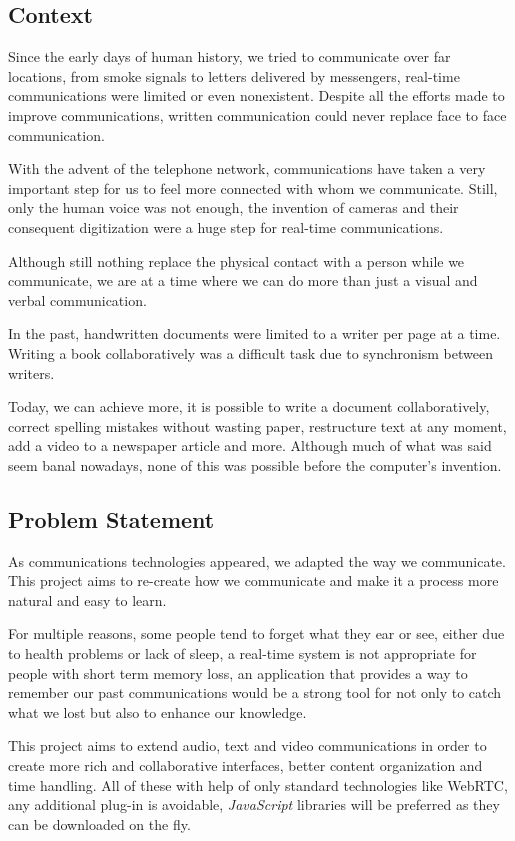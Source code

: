 \subsection{Context}   %
 	Since the early days of human history, we tried to communicate over far locations, from smoke signals to letters delivered by messengers, real-time communications were limited or even nonexistent. Despite all the efforts made to improve communications, written communication could never replace face to face communication.

	With the advent of the telephone network, communications have taken a very important step for us to feel more connected with whom we communicate. Still, only the human voice was not enough, the invention of cameras and their consequent digitization were a huge step for real-time communications.

 	Although still nothing replace the physical contact with a person while we communicate, we are at a time where we can do more than just a visual and verbal communication.
 	
	In the past, handwritten documents were limited to a writer per page at a time. Writing a book collaboratively was a difficult task due to synchronism between writers.

	Today, we can achieve more, it is possible to write a document collaboratively, correct spelling mistakes without wasting paper, restructure text at any moment, add a video to a newspaper article and more. Although much of what was said seem banal nowadays, none of this was possible before the computer's invention. 

\subsection{Problem Statement} %

	As communications technologies appeared, we adapted the way we communicate. This project aims to re-create how we communicate and make it a process more natural and easy to learn. 

	For multiple reasons, some people tend to forget what they ear or see, either due to health problems or lack of sleep, a real-time system is not appropriate for people with short term memory loss, an application that provides a way to remember our past communications would be a strong tool for not only to catch what we lost but also to enhance our knowledge.

	This project aims to extend audio, text and video communications in order to create more rich and collaborative interfaces, better content organization and time handling. All of these with help of only standard technologies like \ac{WebRTC}, any additional plug-in is avoidable, \emph{JavaScript} libraries will be preferred as they can be downloaded on the fly.  

